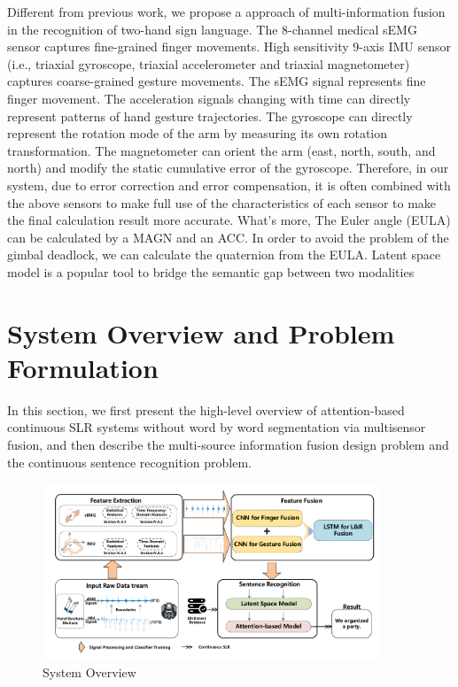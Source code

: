 \documentclass[10pt, conference, letterpaper]{IEEEtran}
\begin{document}
Different from previous work, we propose a approach of multi-information fusion in the recognition of two-hand sign language. The 8-channel medical sEMG sensor captures fine-grained finger movements. High sensitivity 9-axis IMU sensor (i.e., triaxial gyroscope, triaxial accelerometer and triaxial magnetometer) captures coarse-grained gesture movements. The sEMG signal represents fine finger movement. The acceleration signals changing with time can directly represent patterns of hand gesture trajectories. The gyroscope can directly represent the rotation mode of the arm by measuring its own rotation transformation. The magnetometer can orient the arm (east, north, south, and north) and modify the static cumulative error of the gyroscope. Therefore, in our system, due to error correction and error compensation, it is often combined with the above sensors to make full use of the characteristics of each sensor to make the final calculation result more accurate. What's more, The Euler angle (EULA) can be calculated by a MAGN and an ACC. In order to avoid the problem of the gimbal deadlock, we can calculate the quaternion from the EULA. Latent space model is a popular tool to bridge the semantic gap between two modalities




\vspace{1mm}

\section{System Overview and Problem Formulation}
\label{sec:problem}
In this section, we first present the high-level overview of attention-based continuous SLR systems without word by word segmentation via multisensor fusion, and then describe the multi-source information fusion design problem and the continuous sentence recognition problem.

\begin{figure}[!ht]
  \centering
  \includegraphics[width=0.9\textwidth]{pics/SystemOverview.pdf}
  \caption{System Overview}
  \label{fig:overview}
  \vspace{-3mm}
\end{figure}
\end{document}

